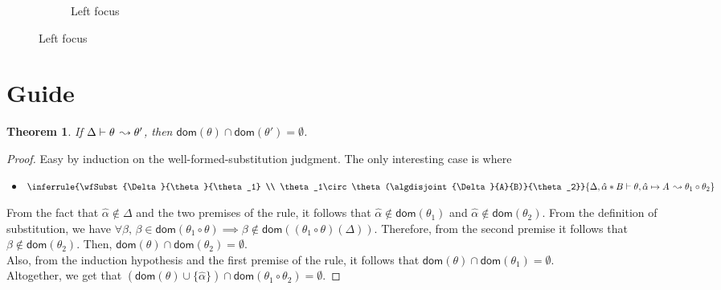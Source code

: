 \documentclass{article}
\newtheorem{theorem}{Theorem}
\begin{document}
\begin{figure}[h]
\begin{subfigure}{\textwidth}
    \caption{Left focus}
  \end{subfigure}
\end{figure}

\section{Guide}
\begin{theorem}
  \newcommand*{\dom}[1]{\mathsf{dom}(#1)}
  If $\Delta\vdash \theta\,\leadsto \theta'$, then $\dom{\theta}\cap\dom{\theta'}=\emptyset$.
\end{theorem}
\begin{proof}
  \newcommand*{\dom}[1]{\mathsf{dom}(#1)}
  Easy by induction on the well-formed-substitution judgment. The only interesting case is where
  \begin{itemize}
  \item \(\inferrule{\wfSubst{\Delta}{\theta}{\theta_1} \\ \theta_1\circ\theta(\algdisjoint{\Delta}{A}{B)}{\theta_2}}{\wfSubst{\Delta,\tentry{\hat{\alpha}}{B}}{\theta,\unification{\alpha}{A}}{\theta_1\circ\theta_2}}\)
  \end{itemize}
  From the fact that $\hat\alpha\not\in\Delta$ and the two premises of the rule, it follows that $\hat\alpha\not\in\dom{\theta_1}$ and $\hat\alpha\not\in\dom{\theta_2}$.
  From the definition of substitution, we have $\forall\beta,\,\beta\in\dom{\theta_1\circ\theta}\implies\beta\not\in\dom{(\theta_1\circ\theta)(\Delta)}$.
  Therefore, from the second premise it follows that $\beta\not\in\dom{\theta_2}$. Then, $\dom{\theta}\cap\dom{\theta_2}=\emptyset$.\\  
  Also, from the induction hypothesis and the first premise of the rule, it follows that $\dom{\theta}\cap\dom{\theta_1}=\emptyset$.\\
  Altogether, we get that $(\dom{\theta}\cup\{\hat\alpha\})\cap\dom{\theta_1\circ\theta_2}=\emptyset$.
\end{proof}
\end{document}
